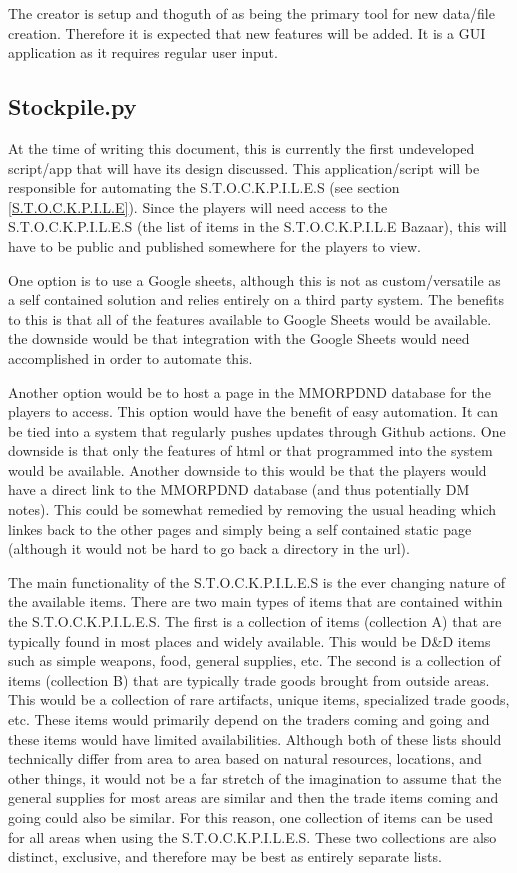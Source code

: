 The creator is setup and thoguth of as being the primary tool for new data/file creation. Therefore it is expected that new features will be added. It is a GUI application as it requires regular user input.

\subsection{Stockpile.py}

At the time of writing this document, this is currently the first undeveloped script/app that will have its design discussed. This application/script will be responsible for automating the S.T.O.C.K.P.I.L.E.S (see section \ref{S.T.O.C.K.P.I.L.E}). Since the players will need access to the S.T.O.C.K.P.I.L.E.S (the list of items in the S.T.O.C.K.P.I.L.E Bazaar), this will have to be public and published somewhere for the players to view. 

One option is to use a Google sheets, although this is not as custom/versatile as a self contained solution and relies entirely on a third party system. The benefits to this is that all of the features available to Google Sheets would be available. the downside would be that integration with the Google Sheets would need accomplished in order to automate this.

Another option would be to host a page in the MMORPDND database for the players to access. This option would have the benefit of easy automation. It can be tied into a system that regularly pushes updates through Github actions. One downside is that only the features of html or that programmed into the system would be available. Another downside to this would be that the players would have a direct link to the MMORPDND database (and thus potentially DM notes). This could be somewhat remedied by removing the usual heading which linkes back to the other pages and simply being a self contained static page (although it would not be hard to go back a directory in the url).

The main functionality of the S.T.O.C.K.P.I.L.E.S is the ever changing nature of the available items. There are two main types of items that are contained within the S.T.O.C.K.P.I.L.E.S. The first is a collection of items (collection A) that are typically found in most places and widely available. This would be D\&D items such as simple weapons, food, general supplies, etc. The second is a collection of items (collection B) that are typically trade goods brought from outside areas. This would be a collection of rare artifacts, unique items, specialized trade goods, etc. These items would primarily depend on the traders coming and going and these items would have limited availabilities. Although both of these lists should technically differ from area to area based on natural resources, locations, and other things, it would not be a far stretch of the imagination to assume that the general supplies for most areas are similar and then the trade items coming and going could also be similar. For this reason, one collection of items can be used for all areas when using the S.T.O.C.K.P.I.L.E.S. These two collections are also distinct, exclusive, and therefore may be best as entirely separate lists.

